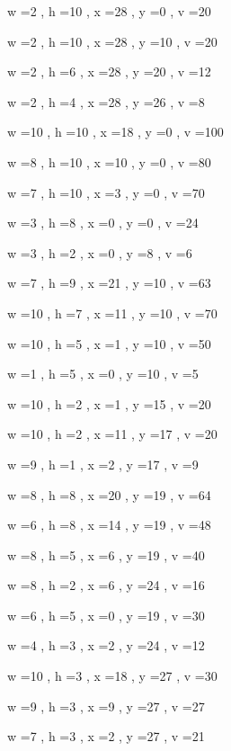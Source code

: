 \documentclass[11pt]{article}
\begin{document}


w =2 , h =10 , x =28 , y =0 , v =20
\par
w =2 , h =10 , x =28 , y =10 , v =20
\par
w =2 , h =6 , x =28 , y =20 , v =12
\par
w =2 , h =4 , x =28 , y =26 , v =8
\par
w =10 , h =10 , x =18 , y =0 , v =100
\par
w =8 , h =10 , x =10 , y =0 , v =80
\par
w =7 , h =10 , x =3 , y =0 , v =70
\par
w =3 , h =8 , x =0 , y =0 , v =24
\par
w =3 , h =2 , x =0 , y =8 , v =6
\par
w =7 , h =9 , x =21 , y =10 , v =63
\par
w =10 , h =7 , x =11 , y =10 , v =70
\par
w =10 , h =5 , x =1 , y =10 , v =50
\par
w =1 , h =5 , x =0 , y =10 , v =5
\par
w =10 , h =2 , x =1 , y =15 , v =20
\par
w =10 , h =2 , x =11 , y =17 , v =20
\par
w =9 , h =1 , x =2 , y =17 , v =9
\par
w =8 , h =8 , x =20 , y =19 , v =64
\par
w =6 , h =8 , x =14 , y =19 , v =48
\par
w =8 , h =5 , x =6 , y =19 , v =40
\par
w =8 , h =2 , x =6 , y =24 , v =16
\par
w =6 , h =5 , x =0 , y =19 , v =30
\par
w =4 , h =3 , x =2 , y =24 , v =12
\par
w =10 , h =3 , x =18 , y =27 , v =30
\par
w =9 , h =3 , x =9 , y =27 , v =27
\par
w =7 , h =3 , x =2 , y =27 , v =21
\par
\newpage
\end{document}
